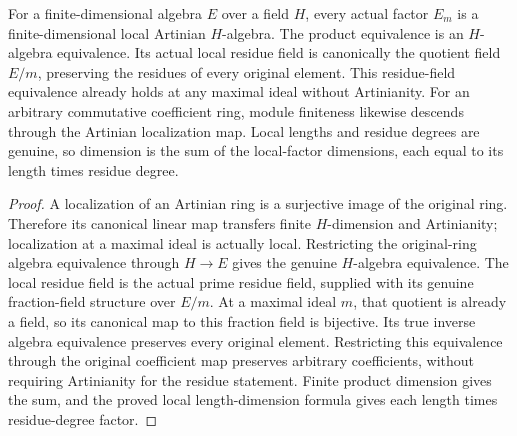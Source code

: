 \begin{theorem}
\label{algebra:finite-artinian-local-factors}
\leanok
{}
For a finite-dimensional algebra $E$ over a field $H$, every actual
factor $E_m$ is a finite-dimensional local Artinian $H$-algebra. The
product equivalence is an $H$-algebra equivalence. Its actual local
residue field is canonically the quotient field $E/m$, preserving
the residues of every original element. This residue-field equivalence
already holds at any maximal ideal without Artinianity. For an arbitrary
commutative coefficient ring, module finiteness likewise descends through
the Artinian localization map. Local lengths and residue
degrees are genuine, so dimension is the sum of the local-factor
dimensions, each equal to its length times residue degree.
\end{theorem}
\begin{proof}
A localization of an Artinian ring is a surjective image of the
original ring. Therefore its canonical linear map transfers finite
$H$-dimension and Artinianity; localization at a maximal ideal is
actually local. Restricting the original-ring algebra equivalence
through $H\to E$ gives the genuine $H$-algebra equivalence.
The local residue field is the actual prime residue field, supplied
with its genuine fraction-field structure over $E/m$. At a maximal
ideal $m$, that quotient is already a field, so its canonical
map to this fraction field is bijective. Its true inverse algebra
equivalence preserves every original element. Restricting this
equivalence through the original coefficient map preserves arbitrary
coefficients, without requiring Artinianity for the residue statement. Finite product dimension gives
the sum, and the proved local length-dimension formula gives each
length times residue-degree factor.
\end{proof}
